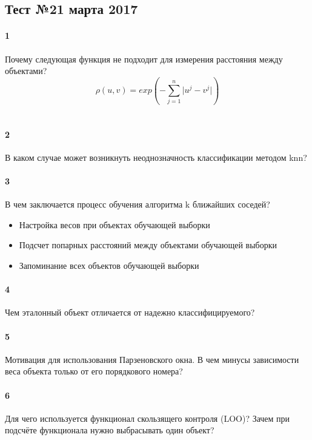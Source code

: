 \documentclass[a4paper,12pt]{article}
\begin{document}
  \subsection*{Тест №2\hfill{1 марта 2017}}

  \paragraph{1} Почему следующая функция не подходит для измерения расстояния между объектами?\\
  $$\rho(u, v) = exp(-\sum\limits_{j=1}^n \vert u^j - v^j \vert)$$\\
  \makebox[\linewidth]{\hrulefill}
  \makebox[\linewidth]{\hrulefill}
  
  \paragraph{2} В каком случае может возникнуть неоднозначность классификации методом knn?

  \makebox[\linewidth]{\hrulefill}
  \makebox[\linewidth]{\hrulefill}  
  
  \paragraph{3} В чем заключается процесс обучения алгоритма k ближайших соседей?
  \begin{itemize}
    \item Настройка весов при объектах обучающей выборки
    \item Подсчет попарных расстояний между объектами обучающей выборки
    \item Запоминание всех объектов обучающей выборки
  \end{itemize}
  
  \paragraph{4} Чем эталонный объект отличается от надежно классифицируемого?\\
  
  \makebox[\linewidth]{\hrulefill}
  \makebox[\linewidth]{\hrulefill}
    
  \paragraph{5} Мотивация для использования Парзеновского окна. В чем минусы зависимости веса
объекта только от его порядкового номера?\\

  \makebox[\linewidth]{\hrulefill}
  \makebox[\linewidth]{\hrulefill}
  
  \paragraph{6} Для чего используется функционал скользящего контроля (LOO)? 
  Зачем при подсчёте функционала нужно выбрасывать один объект?

  \makebox[\linewidth]{\hrulefill}
  \makebox[\linewidth]{\hrulefill}
  \makebox[\linewidth]{\hrulefill}
\end{document}
